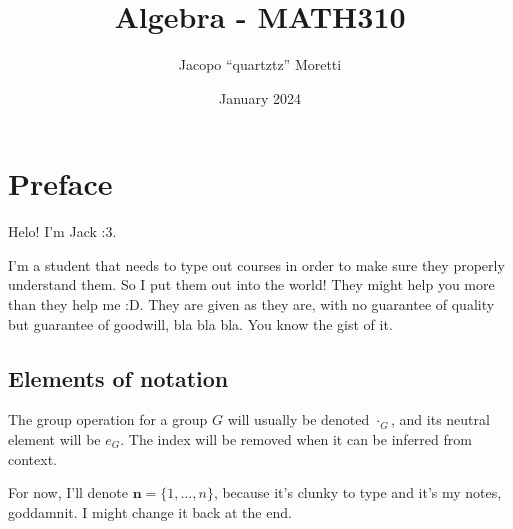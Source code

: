 \documentclass{report} %
\title{Algebra - MATH310}
\author{Jacopo ``quartztz'' Moretti}
\date{January 2024}
\begin{document}
  \maketitle

  \chapter*{Preface}
  Helo! I'm Jack :3.

  I'm a student that needs to type out courses in order to make sure they properly understand them. So I put them out into the world! They might help you more than they help me :D. They are given as they are, with no guarantee of quality but guarantee of goodwill, bla bla bla. You know the gist of it. 

  \section*{Elements of notation}

  The group operation for a group $G$ will usually be denoted $\cdot_G$, and its neutral element will be $e_G$. The index will be removed when it can be inferred from context. 

  For now, I'll denote $\mathbf{n} = \{1, ..., n\}$, because it's clunky to type and it's my notes, goddamnit. I might change it back at the end.

  \tableofcontents

  \pagebreak

  
  
  
  

  \appendix
  
  
  
  
\end{document}
